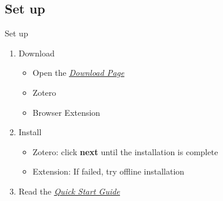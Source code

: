 \documentclass[UTF8]{beamer}
\begin{document}
\subsection{Set up}
\begin{frame}{Set up}
\begin{enumerate}
\item Download
  \begin{itemize}
  \item Open the \href{https://www.zotero.org/download/}{\textit{\color{blue}\underline{Download Page}}}
  \item Zotero
  \item Browser Extension
  \end{itemize}
\item Install
    \begin{itemize}
    \item Zotero: click \textbf{next} until the installation is complete
    \item Extension: If failed, try offline installation
    \end{itemize}
\item Read the \href{https://www.zotero.org/support/quick_start_guide}{\textit{\color{blue}\underline{Quick Start Guide} } }
\end{enumerate}
\end{frame}


\end{document}
